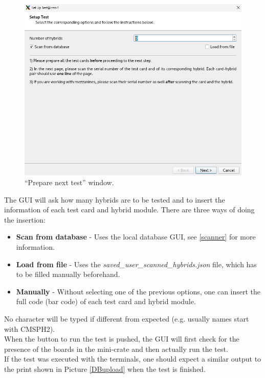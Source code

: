 \documentclass[10pt,a4paper]{article}
\begin{document}
\begin{figure}[!pbth]
\centering
 \includegraphics[width=\linewidth]{Pictures/GUI-prepare.png} 
  \caption{``Prepare next test'' window.}
  \label{prepare}
\end{figure}

The GUI will ask how many hybrids are to be tested and to insert the information of each test card and hybrid module. There are three ways of doing the insertion:

\begin{itemize}
    \item \textbf{Scan from database} - Uses the local database GUI, see \ref{scanner} for more information.
    \item \textbf{Load from file}  - Uses the \textit{saved\_user\_scanned\_hybrids.json} file, which has to be filled manually beforehand.
    \item \textbf{Manually} - Without selecting one of the previous options, one can insert the full code (bar code) of each test card and hybrid module. 
\end{itemize}

No character will be typed if different from expected (e.g. usually names start with CMSPH2). \\
When the button to run the test is pushed, the GUI will first check for the presence of the boards in the mini-crate and then actually run the test. \\

If the test was executed with the terminals, one should expect a similar output to the print shown in Picture \ref{DBupload} when the test is finished. 
\end{document}
